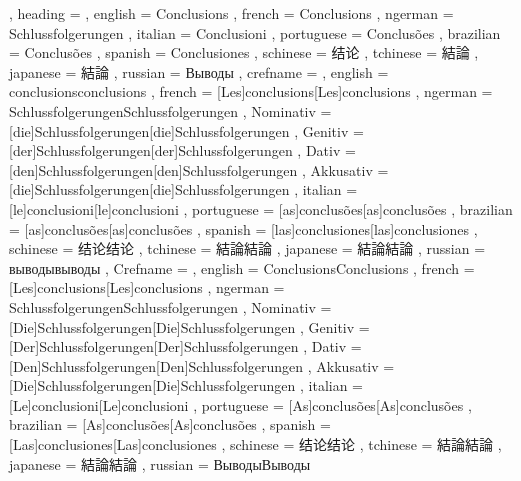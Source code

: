   {
    , heading =   {
                    , english     = Conclusions
                    , french      = Conclusions
                    , ngerman     = Schlussfolgerungen
                    , italian     = Conclusioni
                    , portuguese  = Conclusões
                    , brazilian   = Conclusões
                    , spanish     = Conclusiones
                    , schinese    = 结论
                    , tchinese    = 結論
                    , japanese    = 結論
                    , russian     = Выводы
                  }
    , crefname =  {
                    , english     = {conclusions}{conclusions}
                    , french      = [Les]{conclusions}[Les]{conclusions}
                    , ngerman     = { {Schlussfolgerungen}{Schlussfolgerungen}
                                      , Nominativ = [die]{Schlussfolgerungen}[die]{Schlussfolgerungen}
                                      , Genitiv   = [der]{Schlussfolgerungen}[der]{Schlussfolgerungen}
                                      , Dativ     = [den]{Schlussfolgerungen}[den]{Schlussfolgerungen}
                                      , Akkusativ = [die]{Schlussfolgerungen}[die]{Schlussfolgerungen}
                                    }
                    , italian     = [le]{conclusioni}[le]{conclusioni}
                    , portuguese  = [as]{conclusões}[as]{conclusões}
                    , brazilian   = [as]{conclusões}[as]{conclusões}
                    , spanish     = [las]{conclusiones}[las]{conclusiones}
                    , schinese    = {结论}{结论}
                    , tchinese    = {結論}{結論}
                    , japanese    = {結論}{結論}
                    , russian     = {выводы}{выводы}
                  }
    , Crefname =  {
                    , english     = {Conclusions}{Conclusions}
                    , french      = [Les]{conclusions}[Les]{conclusions}
                    , ngerman     = { {Schlussfolgerungen}{Schlussfolgerungen}
                                      , Nominativ = [Die]{Schlussfolgerungen}[Die]{Schlussfolgerungen}
                                      , Genitiv   = [Der]{Schlussfolgerungen}[Der]{Schlussfolgerungen}
                                      , Dativ     = [Den]{Schlussfolgerungen}[Den]{Schlussfolgerungen}
                                      , Akkusativ = [Die]{Schlussfolgerungen}[Die]{Schlussfolgerungen}
                                    }
                    , italian     = [Le]{conclusioni}[Le]{conclusioni}
                    , portuguese  = [As]{conclusões}[As]{conclusões}
                    , brazilian   = [As]{conclusões}[As]{conclusões}
                    , spanish     = [Las]{conclusiones}[Las]{conclusiones}
                    , schinese    = {结论}{结论}
                    , tchinese    = {結論}{結論}
                    , japanese    = {結論}{結論}
                    , russian     = {Выводы}{Выводы}
                  }
  }

